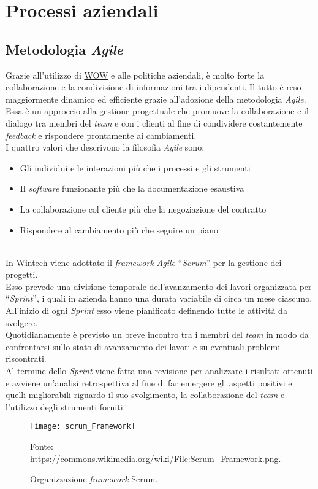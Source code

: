 \section{Processi aziendali}
\subsection{Metodologia \emph{Agile}}
Grazie all'utilizzo di \hyperref[WOW]{WOW} e alle politiche aziendali, è molto forte la collaborazione e la condivisione di informazioni tra i dipendenti. Il tutto è reso maggiormente dinamico ed efficiente grazie all'adozione della metodologia \emph{Agile}.\\
Essa è un approccio alla gestione progettuale che promuove la collaborazione e il dialogo tra membri del \emph{team} e con i clienti al fine di condividere costantemente \emph{feedback} e rispondere prontamente ai cambiamenti.\\
I quattro valori che descrivono la filosofia \emph{Agile} sono:
\begin{itemize}
    \item Gli individui e le interazioni più che i processi e gli strumenti 
    \item Il \emph{software} funzionante più che la documentazione esaustiva  
    \item La collaborazione col cliente più che la negoziazione del contratto 
    \item Rispondere al cambiamento più che seguire un piano\\\\
\end{itemize}
In Wintech viene adottato il \emph{framework} \emph{Agile} “\emph{Scrum}” per la gestione dei progetti.\\
Esso prevede una divisione temporale dell'avanzamento dei lavori organizzata per “\emph{Sprint}”, i quali in azienda hanno una durata variabile di circa un mese ciascuno.\\
All'inizio di ogni \emph{Sprint} esso viene pianificato definendo tutte le attività da svolgere.\\
Quotidianamente è previsto un breve incontro tra i membri del \emph{team} in modo da confrontarsi sullo stato di avanzamento dei lavori e su eventuali problemi riscontrati.\\
Al termine dello \emph{Sprint} viene fatta una revisione per analizzare i risultati ottenuti e avviene un'analisi retrospettiva al fine di far emergere gli aspetti positivi e quelli migliorabili riguardo il suo svolgimento, la collaborazione del \emph{team} e l'utilizzo degli strumenti forniti.\\
\begin{figure}[htbp] 
    \centering 
    \texttt{[image: scrum\_Framework]} 
    \caption{Organizzazione \emph{framework} Scrum.}
    \label{fig:scrum_framework}
    \vspace{1mm}
    Fonte: \url{https://commons.wikimedia.org/wiki/File:Scrum_Framework.png}.
\end{figure}

